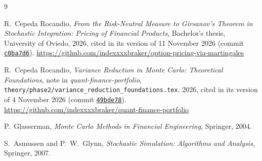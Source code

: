 \documentclass[11pt,a4paper]{article}
\theoremstyle{plain}
\theoremstyle{definition}
\theoremstyle{remark}
\newcommand{\1}{\mathbf{1}}
\begin{document}
\begin{thebibliography}{9}

R.~Cepeda Rocandio,
\emph{From the Risk-Neutral Measure to Girsanov's Theorem in Stochastic
Integration: Pricing of Financial Products},
Bachelor's thesis, University of Oviedo, 2026, cited in its version of
11 November 2026 (commit
\href{https://github.com/indexxxxbraker/option-pricing-via-martingales/tree/c0ba7d6871aaa43e29615066d5f6c0c1419f90fd}{\texttt{c0ba7d6}}).
\url{https://github.com/indexxxxbraker/option-pricing-via-martingales}

R.~Cepeda Rocandio,
\emph{Variance Reduction in Monte Carlo: Theoretical Foundations},
note in \emph{quant-finance-portfolio},
\texttt{theory/phase2/variance\_reduction\_foundations.tex}, 2026,
cited in its version of 4 November 2026 (commit
\href{https://github.com/indexxxxbraker/quant-finance-portfolio/tree/49bde78712b43860a527a96569f397a319fb673f}{\texttt{49bde78}}).
\url{https://github.com/indexxxxbraker/quant-finance-portfolio}

P.~Glasserman,
\emph{Monte Carlo Methods in Financial Engineering},
Springer, 2004.

S.~Asmussen and P.~W.~Glynn,
\emph{Stochastic Simulation: Algorithms and Analysis},
Springer, 2007.

\end{thebibliography}
\end{document}
